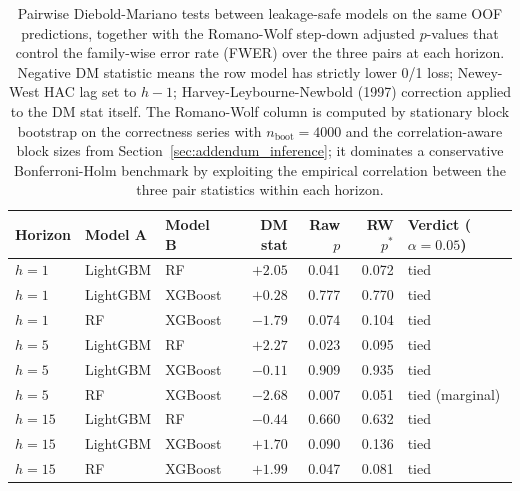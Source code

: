 \documentclass{rQUF2e}
\begin{document}
\begin{table}[H]
\centering
\caption{Pairwise Diebold-Mariano tests between leakage-safe
models on the same OOF predictions, together with the
Romano-Wolf step-down adjusted $p$-values
\citep{romano2005stepwise} that control the family-wise error
rate (FWER) over the three pairs at each horizon. Negative DM
statistic means the row model has strictly lower 0/1 loss;
Newey-West HAC lag set to $h-1$; Harvey-Leybourne-Newbold (1997)
correction applied to the DM stat itself. The Romano-Wolf
column is computed by stationary block bootstrap on the
correctness series with $n_{\text{boot}}=4000$ and the
correlation-aware block sizes from
Section~\ref{sec:addendum_inference}; it dominates a
conservative Bonferroni-Holm benchmark by exploiting the
empirical correlation between the three pair statistics within
each horizon.}
\label{tab:addendum_dm}
\scriptsize
\begin{tabular}{lllrrrl}
\toprule
\textbf{Horizon} & \textbf{Model A} & \textbf{Model B} & \textbf{DM stat} & \textbf{Raw $p$} & \textbf{RW $p^{*}$} & \textbf{Verdict ($\alpha=0.05$)} \\
\midrule
$h=1$  & LightGBM & RF      & $+2.05$ & 0.041 & 0.072 & tied \\
$h=1$  & LightGBM & XGBoost & $+0.28$ & 0.777 & 0.770 & tied \\
$h=1$  & RF       & XGBoost & $-1.79$ & 0.074 & 0.104 & tied \\
$h=5$  & LightGBM & RF      & $+2.27$ & 0.023 & 0.095 & tied \\
$h=5$  & LightGBM & XGBoost & $-0.11$ & 0.909 & 0.935 & tied \\
$h=5$  & RF       & XGBoost & $-2.68$ & 0.007 & 0.051 & tied (marginal) \\
$h=15$ & LightGBM & RF      & $-0.44$ & 0.660 & 0.632 & tied \\
$h=15$ & LightGBM & XGBoost & $+1.70$ & 0.090 & 0.136 & tied \\
$h=15$ & RF       & XGBoost & $+1.99$ & 0.047 & 0.081 & tied \\
\bottomrule
\end{tabular}
\end{table}
\end{document}
